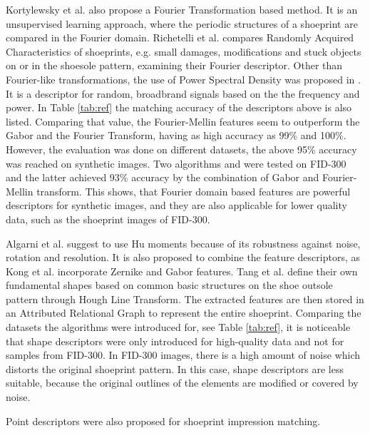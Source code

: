 \documentclass[draft,final]{vutinfth} %
\begin{document}
Kortylewsky et al. \cite{kortylewski2014unsupervised} also propose a Fourier Transformation based method.
It is an unsupervised learning approach, where the periodic structures of a shoeprint are compared in the Fourier domain.
Richetelli et al. \cite{richetelli2017quantitative} compares Randomly Acquired Characteristics of shoeprints, e.g. small damages, modifications and stuck objects on or in the shoesole pattern, examining their Fourier descriptor.
Other than Fourier-like transformations, the use of Power Spectral Density was proposed in \cite{dardi2009texture}.
It is a descriptor for random, broadbrand signals based on the the frequency and power.
In Table \ref{tab:ref} the matching accuracy of the descriptors above is also listed.
Comparing that value, the Fourier-Mellin features seem to outperform the Gabor and the Fourier Transform, having as high accuracy as 99\% and 100\%.
However, the  evaluation was done on different datasets, the above 95\% accuracy was reached on synthetic images.
Two algorithms \cite{kortylewski2014unsupervised} and \cite{wu2019crime} were tested on FID-300 and the latter achieved 93\% accuracy by the combination of Gabor and Fourier-Mellin transform.
This shows, that Fourier domain based features are powerful descriptors for synthetic images, and they are also applicable for lower quality data, such as the shoeprint images of FID-300.
\par
Algarni et al. \cite{algarni2008novel} suggest to use Hu moments because of its robustness against noise, rotation and resolution.
It is also proposed to combine the feature descriptors, as Kong et al. \cite{kong2014novel} incorporate Zernike and Gabor features.
Tang et al. \cite{tang2010footwear} define their own fundamental shapes based on common basic structures on the shoe outsole pattern through Hough Line Transform. 
The extracted features are then stored in an Attributed Relational Graph to represent the entire shoeprint.
Comparing the datasets the algorithms were introduced for, see Table \ref{tab:ref}, it is noticeable that shape descriptors were only introduced for high-quality data and not for samples from FID-300.
In FID-300 images, there is a high amount of noise which distorts the original shoeprint pattern.
In this case, shape descriptors are less suitable, because the original outlines of the elements are modified or covered by noise.
\par
Point descriptors were also proposed for shoeprint impression matching.
\end{document}
